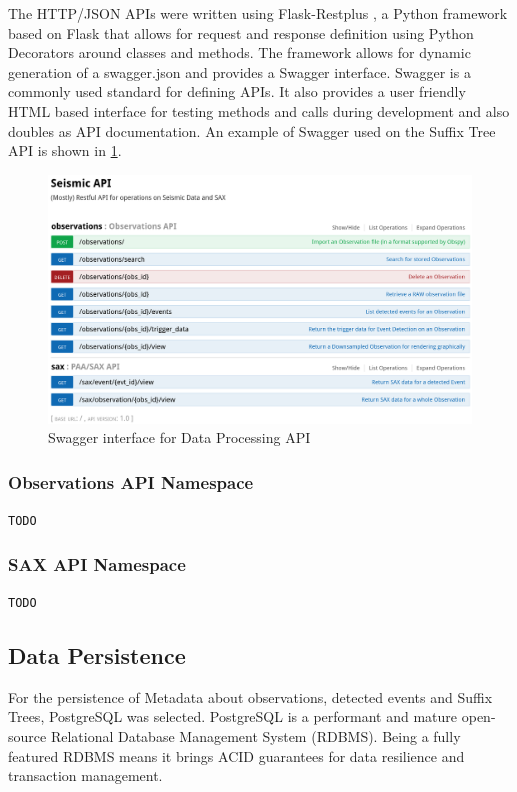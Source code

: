 \documentclass[../report.tex]{subfiles}
\begin{document}
	The HTTP/JSON APIs were written using Flask-Restplus \citep{restplus}, a Python framework based on Flask that allows for request and response definition using Python Decorators around classes and methods.  The framework allows for dynamic generation of a swagger.json and provides a Swagger interface.  Swagger is a commonly used standard for defining APIs.  It also provides a user friendly HTML based interface for testing methods and calls during development and also doubles as API documentation.  An example of Swagger used on the Suffix Tree API is shown in \cref{fig:api}.
	
\begin{figure}[ht]
	\centering
	\includegraphics[width=1\linewidth]{img/api}
	\caption{Swagger interface for Data Processing API}
	\label{fig:api}
\end{figure}

\subsubsection{Observations API Namespace}

	\verb|TODO|

\subsubsection{SAX API Namespace}

	\verb|TODO|

\subsection{Data Persistence} \label{sec:data-persistence}
	For the persistence of Metadata about observations, detected events and Suffix Trees, PostgreSQL was selected.  PostgreSQL is a performant and mature open-source Relational Database Management System (RDBMS).  Being a fully featured RDBMS means it brings ACID guarantees for data resilience and transaction management.
	
\end{document}
